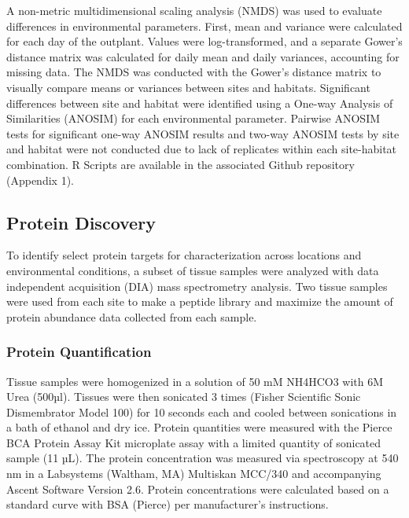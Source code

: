 \documentclass [11pt, proquest] {uwthesis}[2015/03/03]
\begin{document}
A non-metric multidimensional scaling analysis (NMDS) was used to evaluate differences in environmental parameters. First, mean and variance were calculated for each day of the outplant. Values were log-transformed, and a separate Gower's distance matrix was calculated for daily mean and daily variances, accounting for missing data. The NMDS was conducted with the Gower's distance matrix to visually compare means or variances between sites and habitats. Significant differences between site and habitat were identified using a One-way Analysis of Similarities (ANOSIM) for each environmental parameter. Pairwise ANOSIM tests for significant one-way ANOSIM results and two-way ANOSIM tests by site and habitat were not conducted due to lack of replicates within each site-habitat combination. R Scripts are available in the associated Github repository (Appendix 1).

\hypertarget{protein-discovery}{%
\subsection{Protein Discovery}\label{protein-discovery}}

To identify select protein targets for characterization across locations and environmental conditions, a subset of tissue samples were analyzed with data independent acquisition (DIA) mass spectrometry analysis. Two tissue samples were used from each site to make a peptide library and maximize the amount of protein abundance data collected from each sample.

\hypertarget{protein-quantification}{%
\subsubsection{Protein Quantification}\label{protein-quantification}}

Tissue samples were homogenized in a solution of 50 mM NH4HCO3 with 6M Urea (500µl). Tissues were then sonicated 3 times (Fisher Scientific Sonic Dismembrator Model 100) for 10 seconds each and cooled between sonications in a bath of ethanol and dry ice. Protein quantities were measured with the Pierce BCA Protein Assay Kit microplate assay with a limited quantity of sonicated sample (11 µL). The protein concentration was measured via spectroscopy at 540 nm in a Labsystems (Waltham, MA) Multiskan MCC/340 and accompanying Ascent Software Version 2.6. Protein concentrations were calculated based on a standard curve with BSA (Pierce) per manufacturer's instructions.
\end{document}
